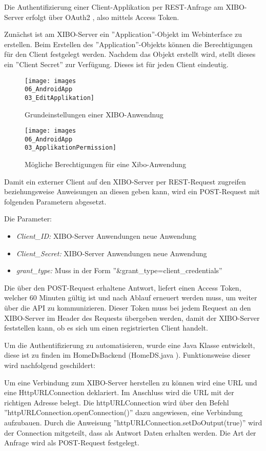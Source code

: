Die Authentifizierung einer Client-Applikation per REST-Anfrage am XIBO-Server erfolgt über OAuth2 , also mittels Access Token.

Zunächst ist am XIBO-Server ein ''Application''-Objekt im Webinterface zu erstellen. Beim Erstellen des ''Application''-Objekts können die Berechtigungen für den Client festgelegt werden. Nachdem das Objekt erstellt wird, stellt dieses ein ''Client Secret'' zur Verfügung. Dieses ist für jeden Client eindeutig.
\begin{figure}[H]
\centering
\texttt{[image: images\\06\_AndroidApp\\03\_EditApplikation]}
\caption{Grundeinstellungen einer XIBO-Anwendnug}
\label{fig:mediaNav}
\end{figure}
\begin{figure}[H]
\centering
\texttt{[image: images\\06\_AndroidApp\\03\_ApplikationPermission]}
\caption{Mögliche Berechtigungen für eine Xibo-Anwendung}
\label{fig:mediaNav}
\end{figure}

Damit ein externer Client auf den XIBO-Server per REST-Request zugreifen beziehungsweise Anweisungen an diesen geben kann, wird ein POST-Request mit folgenden Parametern abgesetzt.

Die Parameter: 
\begin{itemize}
	\item {\em Client\_ID:} XIBO-Server Anwendungen neue Anwendung
	\item {\em Client\_Secret:}  XIBO-Server Anwendungen neue Anwendung
	\item{\em grant\_type:} Muss in der Form ''&grant\_type=client\_credentials''
\end{itemize}

Die über den POST-Request erhaltene Antwort, liefert einen Access Token, welcher 60 Minuten gültig ist und nach Ablauf erneuert werden muss, um weiter über die API zu kommunizieren.
Dieser Token muss bei jedem Request an den XIBO-Server im Header des Requests übergeben werden, damit der XIBO-Server feststellen kann, ob es sich um einen registrierten Client handelt.


Um die Authentifizierung zu automatisieren, wurde eine Java Klasse entwickelt, diese ist zu finden im HomeDsBackend (HomeDS\HomeDsBackend\src\main\java\at\htl\utils\AuthentificationHandler.java
). Funktionsweise dieser wird nachfolgend geschildert: 

Um eine Verbindung zum XIBO-Server herstellen zu können wird eine URL und eine HttpURLConnection deklariert. Im Anschluss wird die URL mit der richtigen Adresse belegt. Die httpURLConnection wird über den Befehl ''httpURLConnection.openConnection()'' dazu angewiesen, eine Verbindung aufzubauen. Durch die Anweisung ''httpURLConnection.setDoOutput(true)'' wird der Connection mitgeteilt, dass als Antwort Daten erhalten werden. Die Art der Anfrage wird als POST-Request festgelegt. 

